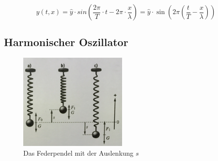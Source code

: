 \documentclass[a4paper]{article}
\begin{document}
			\begin{equation}
				y(t, x)=\hat{y}\cdot sin\left(\frac{2\pi}{T}\cdot t - 2\pi\cdot \frac{x}{\lambda}\right) = \hat{y}\cdot\sin\left(2\pi\left(\frac{t}{T}-\frac{x}{\lambda} \right)\right)
			\end{equation}
			
			
			

		\subsection{Harmonischer Oszillator}
			\begin{figure}[H]
				\centering
				\includegraphics[width=0.48\textwidth]{img/Federpendel_001.jpg}
				\caption{Das Federpendel mit der Auslenkung $s$}
				\label{img:federpendel_001}
			\end{figure}
		
\end{document}
